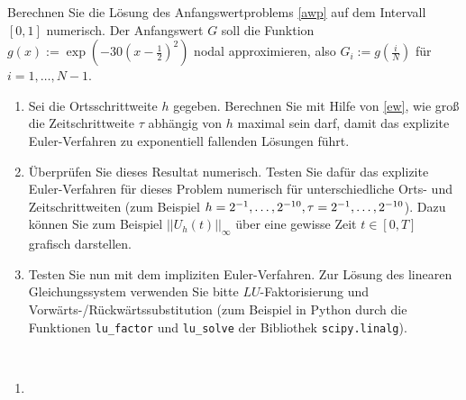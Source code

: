 \begin{exercise}
Berechnen Sie die Lösung des Anfangswertproblems \eqref{awp} auf dem Intervall
$[0,1]$ numerisch. Der Anfangswert $G$ soll die Funktion
$g(x) := \exp\left(-30\left(x-\frac{1}{2}\right)^2\right)$ nodal approximieren, also
$G_i := g\left(\frac{i}{N}\right)$ für $i = 1,\dots,N-1$.
\begin{enumerate}[label = \textbf{\alph*)}]
  \item Sei die Ortsschrittweite $h$ gegeben. Berechnen Sie mit Hilfe von \eqref{ew},
  wie groß die Zeitschrittweite $\tau$ abhängig von $h$ maximal sein darf, damit
  das explizite Euler-Verfahren zu exponentiell fallenden Lösungen führt.
  \item Überprüfen Sie dieses Resultat numerisch. Testen Sie dafür das explizite
  Euler-Verfahren für dieses Problem numerisch für unterschiedliche Orts- und
  Zeitschrittweiten (zum Beispiel $h = 2^{-1},\dots,2^{-10}, \\
  \tau = 2^{-1},\dots,2^{-10}$).
  Dazu können Sie zum Beispiel $||U_h(t)||_{\infty}$ über eine gewisse Zeit $t \in [0,T]$
  grafisch darstellen.
  \item Testen Sie nun mit dem impliziten Euler-Verfahren. Zur Lösung des linearen
  Gleichungssystem verwenden Sie bitte $LU$-Faktorisierung und Vorwärts-/Rückwärtssubstitution
  (zum Beispiel in Python durch die Funktionen \texttt{lu\_factor} und
  \texttt{lu\_solve} der
  Bibliothek \texttt{scipy.linalg}).
\end{enumerate}
\end{exercise}
\begin{solution}
\leavevmode \\
\begin{enumerate}[label = \textbf{\alph*)}]
\item
\end{enumerate}
\end{solution}
